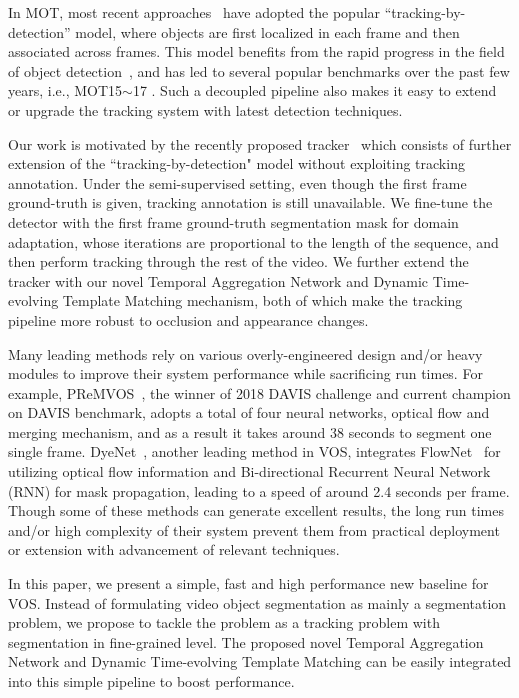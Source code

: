 \documentclass[10pt,twocolumn,letterpaper]{article}
\begin{document}
In MOT, most recent approaches~\cite{xiang2015learning, leal2016learning,  sadeghian2017tracking, chu2017online, sadeghian2017tracking, chu2017online, bochinski2017high, zhu2018online, xu2019spatial, bergmann2019tracking} have adopted the popular “tracking-by-detection” model, where objects are first localized in each frame and then associated across frames.
This model benefits from the rapid progress in the field of object detection~\cite{ross2010dpm, ren2015faster, he2017mask, lin2017feature, lin2017focal, dai2017deformable, cai2018cascade}, and has led to several popular benchmarks over the past few years, i.e., MOT15$\sim$17 \cite{MOTChallenge2015, MOT16}.
Such a decoupled pipeline also makes it easy to extend or upgrade the tracking system with latest detection techniques.


Our work is motivated by the recently proposed tracker~\cite{bergmann2019tracking}
which consists of further extension of the ``tracking-by-detection" model without exploiting tracking annotation.
Under the semi-supervised setting, even though the first frame ground-truth is given, tracking annotation is still unavailable.
We fine-tune the detector with the first frame ground-truth segmentation mask for domain adaptation, whose iterations are proportional to the length of the sequence, and then perform tracking through the rest of the video.
We further extend the tracker with our novel Temporal Aggregation Network and Dynamic Time-evolving Template Matching mechanism, both of which make the tracking pipeline more robust to occlusion and appearance changes.


Many leading methods rely on various overly-engineered design and/or heavy modules to improve their system performance while sacrificing run times.
For example, PReMVOS~\cite{luiten2018premvos}, the winner of 2018 DAVIS challenge and current champion on DAVIS benchmark, adopts a total of four neural networks, optical flow and merging mechanism, and as a result it takes around 38 seconds to segment one single frame.
DyeNet~\cite{xiao2018jointreid}, another leading method in VOS, integrates FlowNet~\cite{flownet2} for utilizing optical flow information and Bi-directional Recurrent Neural Network (RNN) for mask propagation, leading to a speed of around 2.4 seconds per frame.
Though some of these methods can generate excellent results, the long run times and/or high complexity of their system  prevent them from practical deployment or extension with advancement of relevant techniques.

In this paper, we present a simple, fast and high performance new baseline for VOS.
Instead of formulating video object segmentation as mainly a segmentation problem, we propose to tackle the problem as a tracking problem with segmentation in fine-grained level.
The proposed novel Temporal Aggregation Network and Dynamic Time-evolving Template Matching can be easily integrated into this simple pipeline to  boost  performance.
\end{document}
